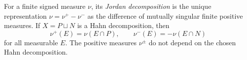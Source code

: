
For a finite signed measure $\nu$, its \emph{Jordan decomposition} is the unique representation $\nu=\nu^+-\nu^-$ as the difference of mutually singular finite positive measures. If $X=P\sqcup N$ is a Hahn decomposition, then
\[
\nu^+(E)=\nu(E\cap P),\qquad \nu^-(E)=-\nu(E\cap N)
\]
for all measurable $E$. The positive measures $\nu^\pm$ do not depend on the chosen Hahn decomposition.
